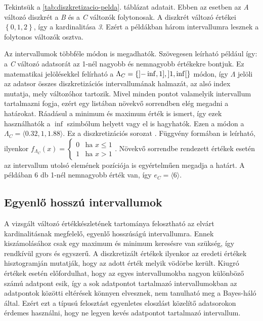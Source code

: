 Tekintsük a \ref{tab:diszkretizacio-pelda}. táblázat adatait. Ebben az esetben az \emph{A} változó diszkrét a \emph{B} és a \emph{C} változók folytonosak. A diszkrét változó értékei $\left\{ 0, 1, 2 \right\}$, így a kardinalitása \emph{3}. Ezért a példákban három intervallumra lesznek a folytonos változók osztva.

Az intervallumok többféle módon is megadhatók. Szövegesen leírható például így: a \emph{C} változó adatsorát az 1-nél nagyobb és nemnagyobb értékekre bontjuk. Ez matematikai jelölésekkel felírható a $\Lambda_{C} = \left\{ \interval[open left]{-\inf}{1}, \interval[open]{1}{\inf} \right\} $ módon, így $\Lambda$ jelöli az adatsor összes diszkretizációs intervallumának halmazát, az alsó index mutatja, mely változóhoz tartozik. Mivel minden pontot valamelyik intervallum tartalmazni fogja, ezért egy listában növekvő sorrendben elég megadni a határokat. Ráadásul a minimum és maximum érték is ismert, így ezek használhatók a $\inf$ szimbólum helyett vagy el is hagyhatók. Ezen a módon a $\Lambda_{C} = \langle 0.32, 1, 1.88 \rangle$. Ez a diszkretizációs sorozat \cite{friedman1996discretizing}. Függvény formában is leírható, ilyenkor
$f_{\Lambda_{C}}(x) = \left\{ \begin{array}{ll}
    0 & \mbox{ha } x \leq 1 \\
    1 & \mbox{ha } x > 1
\end{array} \right.$. Növekvő sorrendbe rendezett értékek esetén az intervallum utolsó elemének pozíciója is egyértelműen megadja a határt. A példában 6 db 1-nél nemnagyobb érték van, így $e_{C} = \langle 6 \rangle$.

\subsection{Egyenlő hosszú intervallumok}
A vizsgált változó értékkészletének tartománya felosztható az elvárt kardinalitásnak megfelelő, egyenlő hosszúságú intervallumra. Ennek kiszámolásához csak egy maximum és minimum keresésre van szükség, így rendkívül gyors és egyszerű. A diszkretizált értékek ilyenkor az eredeti értékek hisztogramján mutatják, hogy az adott érték melyik vödörbe került. Kiugró értékek esetén előfordulhat, hogy az egyes intervallumokba nagyon különböző számú adatpont esik, így a sok adatpontot tartalmazó intervallumokban az adatpontok közötti eltérések könnyen elvesznek, nem tanulható meg a Bayes-háló által. Ezért ezt a típusú felosztást egyenletes eloszlást közelítő adatsorokon érdemes használni, hogy ne legyen kevés adatpontot tartalmazó intervallum.

